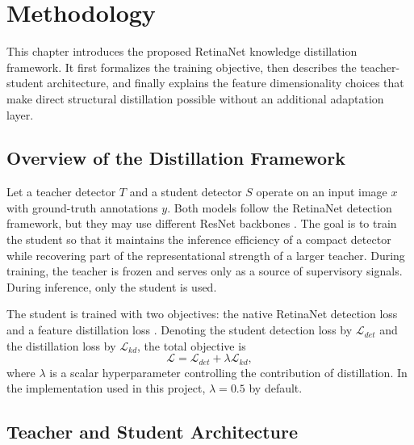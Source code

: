 \chapter{Methodology}

This chapter introduces the proposed RetinaNet knowledge distillation framework. It first formalizes the training objective, then describes the teacher-student architecture, and finally explains the feature dimensionality choices that make direct structural distillation possible without an additional adaptation layer.

\section{Overview of the Distillation Framework}

Let a teacher detector $T$ and a student detector $S$ operate on an input image $x$ with ground-truth annotations $y$. Both models follow the RetinaNet detection framework, but they may use different ResNet backbones \cite{he2016resnet,lin2017focal}. The goal is to train the student so that it maintains the inference efficiency of a compact detector while recovering part of the representational strength of a larger teacher. During training, the teacher is frozen and serves only as a source of supervisory signals. During inference, only the student is used.

The student is trained with two objectives: the native RetinaNet detection loss and a feature distillation loss \cite{hinton2015distilling,lin2017focal}. Denoting the student detection loss by $\mathcal{L}_{det}$ and the distillation loss by $\mathcal{L}_{kd}$, the total objective is
\begin{equation}
  \mathcal{L} = \mathcal{L}_{det} + \lambda \mathcal{L}_{kd},
  \label{eq:total-loss}
\end{equation}
where $\lambda$ is a scalar hyperparameter controlling the contribution of distillation. In the implementation used in this project, $\lambda=0.5$ by default.

\section{Teacher and Student Architecture}

